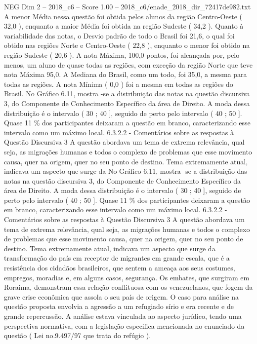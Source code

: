 \begin{textsample}{NEG Dim 2 – 2018\_c6 – Score 1.00 – 2018\_c6/enade\_2018\_dir\_72417de982.txt}
A menor Média nessa questão foi obtida pelos alunos da região Centro-Oeste ( 32,0 ), enquanto a maior Média foi obtida na região Sudeste ( 34,2 ).
Quanto à variabilidade das notas, o Desvio padrão de todo o Brasil foi 21,6, o qual foi obtido nas regiões Norte e Centro-Oeste ( 22,8 ), enquanto o menor foi obtido na região Sudeste ( 20,6 ).
A nota Máxima, 100,0 pontos, foi alcançada por, pelo menos, um aluno de quase todas as regiões, com exceção da região Norte que teve nota Máxima 95,0.
A Mediana do Brasil, como um todo, foi 35,0, a mesma para todas as regiões.
A nota Mínima ( 0,0 ) foi a mesma em todas as regiões do Brasil.
No Gráfico 6.11, mostra -se a distribuição das notas na questão discursiva 3, do Componente de Conhecimento Específico da área de Direito.
A moda dessa distribuição é o intervalo ( 30 ; 40 ], seguido de perto pelo intervalo ( 40 ; 50 ].
Quase 11 \% dos participantes deixaram a questão em branco, caracterizando esse intervalo como um máximo local. 6.3.2.2 - Comentários sobre as respostas à Questão Discursiva 3 A questão abordava um tema de extrema relevância, qual seja, as migrações humanas e todos o complexo de problemas que esse movimento causa, quer na origem, quer no seu ponto de destino.
Tema extremamente atual, indicava um aspecto que surge da No Gráfico 6.11, mostra -se a distribuição das notas na questão discursiva 3, do Componente de Conhecimento Específico da área de Direito.
A moda dessa distribuição é o intervalo ( 30 ; 40 ], seguido de perto pelo intervalo ( 40 ; 50 ].
Quase 11 \% dos participantes deixaram a questão em branco, caracterizando esse intervalo como um máximo local. 6.3.2.2 - Comentários sobre as respostas à Questão Discursiva 3 A questão abordava um tema de extrema relevância, qual seja, as migrações humanas e todos o complexo de problemas que esse movimento causa, quer na origem, quer no seu ponto de destino.
Tema extremamente atual, indicava um aspecto que surge da transformação do país em receptor de migrantes em grande escala, que é a resistência dos cidadãos brasileiros, que sentem a ameaça aos seus costumes, empregos, moradias e, em alguns casos, segurança.
Os embates, que surgiram em Roraima, demonstram essa relação conflituosa com os venezuelanos, que fogem da grave crise econômica que assola o seu país de origem.
O caso para análise na questão proposta envolvia a agressão a um refugiado sírio e era recente e de grande repercussão.
A análise estava vinculada ao aspecto jurídico, tendo uma perspectiva normativa, com a legislação especifica mencionada no enunciado da questão ( Lei no.9.497/97 que trata do refúgio ).

\end{textsample}
